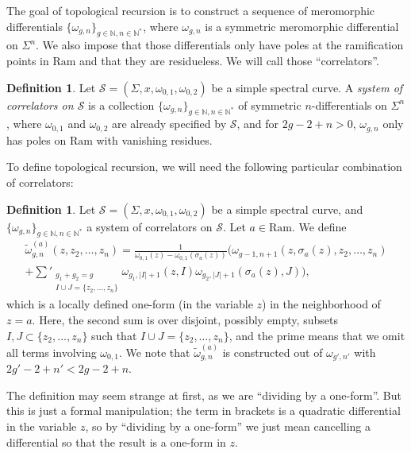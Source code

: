 \documentclass[reqno,oneside,11pt]{amsart}
\theoremstyle{plain}
\theoremstyle{definition}
\newtheorem{definition}[theorem]{Definition}
\theoremstyle{remark}
\numberwithin{equation}{section}
\newcommand{\Ra}{\text{Ram}}
\begin{document}
The goal of topological recursion is to construct a sequence of meromorphic differentials $\{\omega_{g,n} \}_{g \in \mathbb{N}, n \in \mathbb{N}^*}$, where $\omega_{g,n}$ is a symmetric meromorphic differential on $\Sigma^n$. We also impose that those differentials only have poles at the ramification points in $\Ra$ and that they are residueless. We will call those ``correlators''.

\begin{definition}\label{d:system}
Let $\mathcal{S} = (\Sigma,x,\omega_{0,1}, \omega_{0,2})$ be a simple spectral curve. A \emph{system of correlators on $\mathcal{S}$} is a collection $\{\omega_{g,n} \}_{g \in \mathbb{N}, n \in \mathbb{N}^* }$ of symmetric $n$-differentials on $\Sigma^n$, where $\omega_{0,1}$ and $\omega_{0,2}$ are already specified by $\mathcal{S}$, and for $2g-2+n>0$, $\omega_{g,n}$ only has poles on $\Ra$ with vanishing residues.
\end{definition}

To define topological recursion, we will need the following particular combination of correlators:
\begin{definition}\label{d:comb}
Let $\mathcal{S} = (\Sigma,x,\omega_{0,1}, \omega_{0,2})$ be a simple spectral curve, and $\{\omega_{g,n} \}_{g \in \mathbb{N}, n \in \mathbb{N}^* }$ a system of correlators on $\mathcal{S}$. Let $a \in \Ra$. We define
\begin{multline}\label{eq:comb}
\tilde{\omega}^{(a)}_{g,n}(z, z_2, \ldots, z_n) = \frac{1}{\omega_{0,1}(z) - \omega_{0,1}(\sigma_a(z))} \Big( \omega_{g-1,n+1}(z, \sigma_a(z), z_2, \ldots, z_n) \\+ \sum'_{\substack{g_1+g_2=g \\ I \cup J = \{z_2, \ldots, z_n \}}} \omega_{g_1, |I|+1}(z, I) \omega_{g_2, |J|+1} (\sigma_a(z), J) \Big),
\end{multline}
which is a locally defined one-form (in the variable $z$) in the neighborhood of $z=a$. Here, the second sum is over disjoint, possibly empty, subsets $I, J \subset \{ z_2, \ldots, z_n\}$ such that $I \cup J = \{z_2, \ldots, z_n\}$, and the prime means that we omit all terms involving $\omega_{0,1}$.  We note that $\tilde{\omega}_{g,n}^{(a)}$ is constructed out of $\omega_{g',n'}$ with $2g'-2+n' < 2g-2+n$.
\end{definition}

The definition may seem strange at first, as we are ``dividing by a one-form''. But this is just a formal manipulation; the term in brackets is a quadratic differential in the variable $z$, so by  ``dividing by a one-form'' we just mean cancelling a differential so that the result is a one-form in $z$.
\end{document}
